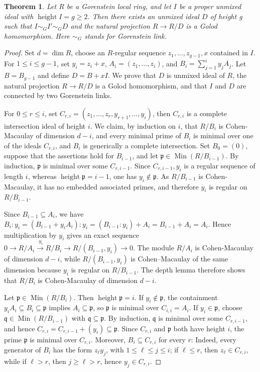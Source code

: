 \documentclass[11pt,letterpaper]{amsart}
\newcommand{\x}{\xrightarrow{}}
\DeclareMathOperator{\Min}{Min}
\DeclareMathOperator{\height}{height}
\theoremstyle{plain}
\newtheorem{thm}{Theorem}[section]
\theoremstyle{definition}
\theoremstyle{remark}
\begin{document}
\begin{thm}\label{GolodGorensteinlinkage}
    Let $R$ be a Gorenstein local ring, and let $I$ be a proper unmixed ideal with $\height I=g\ge 2$. Then there exists an unmixed ideal $D$ of height g such that $I\sim_G I'\sim_G D$ and the natural projection $R\x R/D$ is a Golod homomorphism. Here $\sim_G$ stands for Gorenstein link. 
\end{thm}

\begin{proof}
Set \(d=\dim R\), choose an \(R\)-regular sequence \(z_1,\ldots,z_{g-1},x\) contained in \(I\). For \(1\leq i\leq g-1\), set \(y_i=z_i+x\), \(A_i=(z_1,\ldots,z_i)\), and \(B_i=\sum_{j=1}^{i}y_jA_j\). Let \(B=B_{g-1}\) and define \(D=B+xI\). We prove that \(D\) is unmixed ideal of $R$, the natural projection \(R\to R/D\) is a Golod homomorphism, and that \(I\) and \(D\) are connected by two Gorenstein links.

For \(0\leq r\leq i\), set \(C_{r,i}=(z_1,\ldots,z_r,y_{r+1},\ldots,y_i)\), then $C_{r,i}$ is a complete intersection ideal of height $i$. We claim, by induction on \(i\), that \(R/B_i\) is Cohen-Macaulay of dimension \(d-i\), and every minimal prime of \(B_i\) is minimal over one of the ideals \(C_{r,i}\), and \(B_i\) is generically a complete intersection. Set \(B_0=(0)\), suppose that the assertions hold for \(B_{i-1}\), and let \(\mathfrak p\in\Min(R/B_{i-1})\). By induction, \(\mathfrak p\) is minimal over some \(C_{r,i-1}\). Since \(C_{r,i-1},y_i\) is a regular sequence of length \(i\), whereas \(\height\mathfrak p=i-1\), one has \(y_i\notin\mathfrak p\). As \(R/B_{i-1}\) is Cohen-Macaulay, it has no embedded associated primes, and therefore \(y_i\) is regular on \(R/B_{i-1}\).

Since \(B_{i-1}\subseteq A_i\), we have \(B_i:y_i=(B_{i-1}+y_iA_i):y_i=(B_{i-1}:y_i)+A_i=B_{i-1}+A_i=A_i\). Hence multiplication by \(y_i\) gives an exact sequence \(0\to R/A_i\xrightarrow{\cdot y_i}R/B_i\to R/(B_{i-1},y_i)\to0\). The module \(R/A_i\) is Cohen-Macaulay of dimension \(d-i\), while \(R/(B_{i-1},y_i)\) is Cohen--Macaulay of the same dimension because \(y_i\) is regular on \(R/B_{i-1}\). The depth lemma therefore shows that \(R/B_i\) is Cohen-Macaulay of dimension \(d-i\).

Let \(\mathfrak p\in\Min(R/B_i)\). Then \(\height\mathfrak p=i\). If \(y_i\notin\mathfrak p\), the containment \(y_iA_i\subseteq B_i\subseteq\mathfrak p\) implies \(A_i\subseteq\mathfrak p\), so \(\mathfrak p\) is minimal over \(C_{i,i}=A_i\). If \(y_i\in\mathfrak p\), choose \(\mathfrak q\in\Min(R/B_{i-1})\) with \(\mathfrak q\subseteq\mathfrak p\). By induction, \(\mathfrak q\) is minimal over some \(C_{r,i-1}\), and hence \(C_{r,i}=C_{r,i-1}+(y_i)\subseteq\mathfrak p\). Since \(C_{r,i}\) and \(\mathfrak p\) both have height \(i\), the prime \(\mathfrak p\) is minimal over \(C_{r,i}\). Moreover, \(B_i\subseteq C_{r,i}\) for every \(r\): Indeed, every generator of \(B_i\) has the form \(z_\ell y_j\), with \(1\leq \ell\leq j\leq i\); if \(\ell\leq r\), then \(z_\ell\in C_{r,i}\), while if \(\ell>r\), then \(j\geq \ell>r\), hence \(y_j\in C_{r,i}\).


\end{proof}
\end{document}
